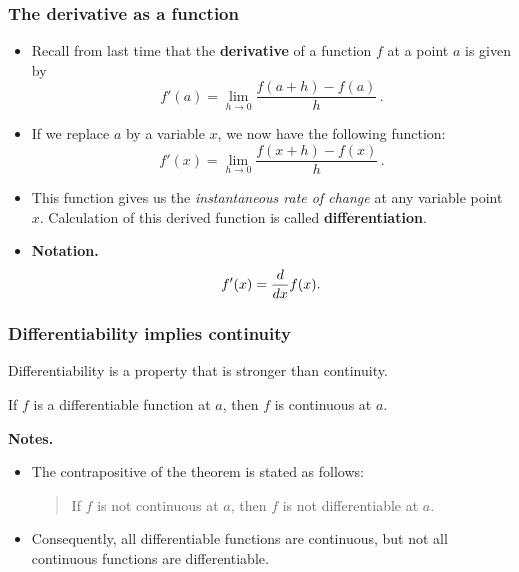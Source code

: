 \documentclass[10pt,t,presentation,ignorenonframetext,aspectratio=169]{beamer}
\title[\course]{\lecTitle}
\institute[Ohio State]
{
  \medskip
}
\date[\week]{\semester}
\author{Tae Eun Kim, Ph.D.}
\begin{document}
\begin{frame}
  \titlepage
\end{frame}

\begin{frame}
  \frametitle{The derivative as a function}
  \begin{itemize}
  \item Recall from last time that the \textbf{derivative} of a
    function $f$ at a point $a$ is given by
    \[
      f'(a) = \lim_{h \to 0} \frac{f(a+h)-f(a)}{h} \,.
    \]
  \item If we replace $a$ by a variable $x$, we now have the following function:
    \[
      f'(x) = \lim_{h \to 0} \frac{f(x+h)-f(x)}{h} \,.
    \]
  \item This function gives us the \textit{instantaneous rate of change} at
    any variable point $x$. Calculation of this derived function is
    called \textbf{differentiation}.
  \item \textbf{Notation.}
    \[
      f'(x) = \frac{d}{\mathop{}\!d x} f(x) .
    \]
  \end{itemize}
\end{frame}


\begin{frame}
  \frametitle{Differentiability implies continuity}
  Differentiability is a property that is stronger than continuity.

  \begin{thm}
    If $f$ is a differentiable function at $a$, then $f$ is continuous at $a$.
  \end{thm}

  \vfill
  \textbf{Notes.}
  \begin{itemize}
  \item The contrapositive of the theorem is stated as follows:
    \begin{quote}
      If $f$ is not continuous at $a$, then $f$ is not
      differentiable at $a$.
    \end{quote}
  \item Consequently, all differentiable functions are continuous, but
    not all continuous functions are differentiable.
  \end{itemize}
\end{frame}
\end{document}
